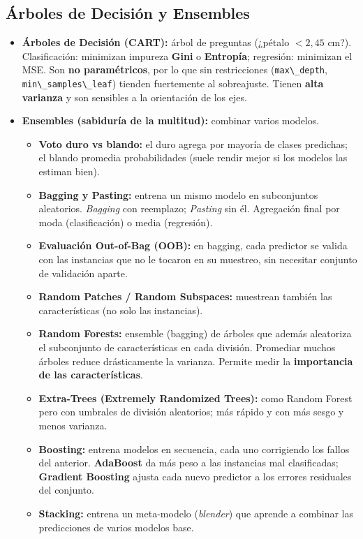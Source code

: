 \documentclass[12pt]{book} %
\providecommand{\tightlist}{%
  \setlength{\itemsep}{0pt}\setlength{\parskip}{0pt}}
\begin{document}
\hypertarget{uxe1rboles-de-decisiuxf3n-y-ensembles}{%
\subsection{Árboles de Decisión y
Ensembles}\label{uxe1rboles-de-decisiuxf3n-y-ensembles}}

\begin{itemize}
\tightlist
\item
  \textbf{Árboles de Decisión (CART):} árbol de preguntas (¿pétalo
  \(< 2{,}45\) cm?). Clasificación: minimizan impureza \textbf{Gini} o
  \textbf{Entropía}; regresión: minimizan el MSE. Son \textbf{no
  paramétricos}, por lo que sin restricciones
  (\passthrough{\lstinline!max\_depth!},
  \passthrough{\lstinline!min\_samples\_leaf!}) tienden fuertemente al
  sobreajuste. Tienen \textbf{alta varianza} y son sensibles a la
  orientación de los ejes.
\item
  \textbf{Ensembles (sabiduría de la multitud):} combinar varios
  modelos.

  \begin{itemize}
  \tightlist
  \item
    \textbf{Voto duro vs blando:} el duro agrega por mayoría de clases
    predichas; el blando promedia probabilidades (suele rendir mejor si
    los modelos las estiman bien).
  \item
    \textbf{Bagging y Pasting:} entrena un mismo modelo en subconjuntos
    aleatorios. \emph{Bagging} con reemplazo; \emph{Pasting} sin él.
    Agregación final por moda (clasificación) o media (regresión).
  \item
    \textbf{Evaluación Out-of-Bag (OOB):} en bagging, cada predictor se
    valida con las instancias que no le tocaron en su muestreo, sin
    necesitar conjunto de validación aparte.
  \item
    \textbf{Random Patches / Random Subspaces:} muestrean también las
    características (no solo las instancias).
  \item
    \textbf{Random Forests:} ensemble (bagging) de árboles que además
    aleatoriza el subconjunto de características en cada división.
    Promediar muchos árboles reduce drásticamente la varianza. Permite
    medir la \textbf{importancia de las características}.
  \item
    \textbf{Extra-Trees (Extremely Randomized Trees):} como Random
    Forest pero con umbrales de división aleatorios; más rápido y con
    más sesgo y menos varianza.
  \item
    \textbf{Boosting:} entrena modelos en secuencia, cada uno
    corrigiendo los fallos del anterior. \textbf{AdaBoost} da más peso a
    las instancias mal clasificadas; \textbf{Gradient Boosting} ajusta
    cada nuevo predictor a los errores residuales del conjunto.
  \item
    \textbf{Stacking:} entrena un meta-modelo (\emph{blender}) que
    aprende a combinar las predicciones de varios modelos base.
  \end{itemize}
\end{itemize}
\end{document}
